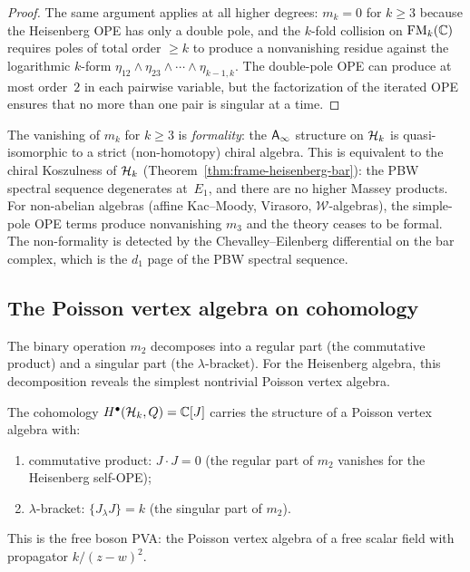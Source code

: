 \begin{proof}
The same argument applies at all higher degrees: $m_k = 0$
for $k \geq 3$ because the Heisenberg OPE has only a double
pole, and the $k$-fold collision on $\mathrm{FM}_k(\mathbb{C})$ requires
poles of total order $\geq k$ to produce a nonvanishing
residue against the logarithmic $k$-form
$\eta_{12} \wedge \eta_{23} \wedge \cdots \wedge \eta_{k-1,k}$.
The double-pole OPE can produce at most order~$2$ in each pairwise
variable, but the factorization of the iterated OPE ensures that
no more than one pair is singular at a time.
\end{proof}

\begin{remark}
\label{rem:rosetta-formality-koszulness}
The vanishing of $m_k$ for $k \geq 3$ is \emph{formality}: the
$\mathsf{A}_{\infty}$ structure on $\mathcal{H}_k$ is quasi-isomorphic to a strict
(non-homotopy) chiral algebra.  This is equivalent to the
chiral Koszulness of $\mathcal{H}_k$
(Theorem~\ref{thm:frame-heisenberg-bar}): the PBW spectral
sequence degenerates at~$E_1$, and there are no higher Massey
products.  For non-abelian algebras (affine Kac--Moody, Virasoro,
$\mathcal{W}$-algebras), the simple-pole OPE terms produce
nonvanishing $m_3$ and the theory ceases to be formal.
The non-formality is detected by the Chevalley--Eilenberg
differential on the bar complex, which is the $d_1$ page of
the PBW spectral sequence.
\end{remark}


\subsection{The Poisson vertex algebra on cohomology}
\label{subsec:rosetta-pva}

The binary operation $m_2$ decomposes into a regular part (the
commutative product) and a singular part (the $\lambda$-bracket).
For the Heisenberg algebra, this decomposition reveals the
simplest nontrivial Poisson vertex algebra.

\begin{proposition}
\label{prop:rosetta-pva}
The cohomology $H^{\bullet}(\mathcal{H}_k, Q) = \mathbb{C}[J]$ carries the
structure of a Poisson vertex algebra with:
\begin{enumerate}[label=\textup{(\roman*)}]
\item\label{item:rosetta-pva-product}
  commutative product: $J \cdot J = 0$
  \textup{(}the regular part of $m_2$ vanishes for the
  Heisenberg self-OPE\textup{)};
\item\label{item:rosetta-pva-bracket}
  $\lambda$-bracket: $\{J_\lambda J\} = k$
  \textup{(}the singular part of $m_2$\textup{)}.
\end{enumerate}
This is the free boson PVA: the Poisson vertex algebra of a free
scalar field with propagator $k/(z - w)^2$.
\end{proposition}

